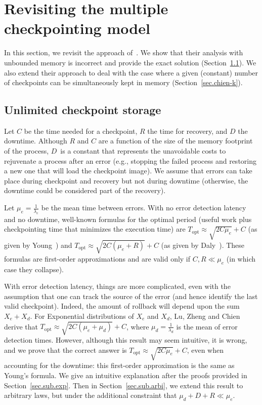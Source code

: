 \documentclass[10pt,table]{article}
\newcommand{\ema}[1]{\ensuremath{#1}\xspace}
\newcommand{\lambdae}{\ema{\lambda_{e}}}
\newcommand{\lambdad}{\ema{\lambda_{d}}}
\newcommand{\mue}{\ema{\mu_{e}}}
\newcommand{\mud}{\ema{\mu_{d}}}
\newcommand{\ccc}{\ema{C}}
\newcommand{\rrr}{\ema{R}}
\newcommand{\ddd}{\ema{D}}
\newcommand{\Topt}{\ema{T_{\text{opt}}}}
\begin{document}
\section{Revisiting the multiple checkpointing model}
\label{sec.chien}

In this section, we revisit the approach of~\cite{LuZhengChien2013}.
We show that their analysis with unbounded memory is incorrect and provide the exact solution 
(Section~\ref{sec.chien-infty}). We also
extend their approach to deal with the case where a given (constant) number of 
checkpoints can be simultaneously kept in memory (Section~\ref{sec.chien-k}).



\subsection{Unlimited checkpoint storage}
\label{sec.chien-infty}

 Let $\ccc$ be the time needed for a checkpoint,  $\rrr$ the time for
recovery, and $\ddd$ the downtime. Although $\rrr$ and $\ccc$ are
a function of the size of the memory footprint of the process, $\ddd$~is a constant 
that represents the unavoidable costs to rejuvenate a
process after an error (e.g., stopping the failed process and restoring
a new one that will load the checkpoint image). We assume that errors
can take place during checkpoint and recovery but not during downtime (otherwise, the downtime
could be considered part of the recovery). 

Let $\mue = \frac{1}{\lambdae}$ be the mean time between errors.
With  no error detection latency and no downtime, well-known formulas for the optimal period 
(useful work plus checkpointing time that minimizes the execution time)
are $\Topt \approx \sqrt{2 \ccc \mue} + \ccc$ (as given by Young~\cite{young74})
and $\Topt \approx \sqrt{2 \ccc (\mue+\rrr)}+ \ccc$ (as given by Daly~\cite{daly04}).
These formulas are first-order approximations and are valid only if $\ccc, \rrr \ll \mue$ 
(in which case they collapse). 

With error detection latency, things are more complicated, even with the assumption
 that one can track the source of the error (and hence identify the last valid checkpoint). 
 Indeed, the amount of rollback will depend upon the sum $X_{e} + X_{d}$.
For Exponential distributions of  $X_{e}$ and $X_{d}$, Lu, Zheng and Chien~\cite{LuZhengChien2013} derive that 
   $\Topt \approx \sqrt{2 \ccc (\mue + \mud) }+ \ccc$, 
  where $\mud = \frac{1}{\lambdad}$ is the mean of error detection times. 
However, although this result may seem intuitive, it is wrong, and we prove that the correct answer
is $\Topt \approx \sqrt{2 \ccc \mue} + \ccc$, even when accounting for the downtime: 
this first-order approximation is the same as Young's formula. We give an intuitive explanation after the proofs
provided in Section~\ref{sec.sub.exp}. Then in Section~\ref{sec.sub.arbi}, we extend this result to
arbitrary laws, but under the additional constraint that $\mud+\ddd+\rrr \ll \mue$.
\end{document}
